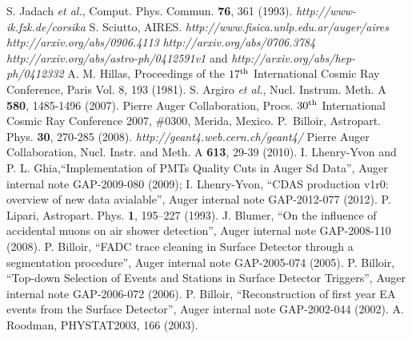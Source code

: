 \begin{thebibliography}{1}
 S. Jadach {\it et al.}, Comput. Phys. Commun. {\bf 76}, 361 (1993).
 \emph{http://www-ik.fzk.de/corsika}
 S. Sciutto, AIRES. \emph{http://www.fisica.unlp.edu.ar/auger/aires}
 \emph{http://arxiv.org/abs/0906.4113}
 \emph{http://arxiv.org/abs/0706.3784}
 \emph{http://arxiv.org/abs/astro-ph/0412591v1} and \emph{http://arxiv.org/abs/hep-ph/0412332}
 A. M. Hillas, Proceedings of the $17^{\rm th}$ International Cosmic Ray Conference, Paris Vol. 8, 193 (1981).
 S. Argiro {\it et al.}, Nucl. Instrum. Meth. A \textbf{580}, 1485-1496 (2007).
 Pierre Auger Collaboration, Procs. $30^{\rm th}$ International Cosmic Ray Conference 2007, $\#$0300, Merida, Mexico.
 P.~Billoir, Astropart. Phys. {\bf 30}, 270-285 (2008).
 \emph{http://geant4.web.cern.ch/geant4/}
 Pierre Auger Collaboration, Nucl. Instr. and Meth. A {\bf 613}, 29-39 (2010).
 I. Lhenry-Yvon and P. L. Ghia,``Implementation of PMTs Quality Cuts in Auger Sd Data'', Auger internal note GAP-2009-080 (2009);
I. Lhenry-Yvon, ``CDAS production v1r0: overview of new data avialable'', Auger internal note GAP-2012-077 (2012).
 P. Lipari, Astropart. Phys. \textbf{1}, 195–227 (1993).
 J. Blumer, ``On the influence of accidental muons on air shower detection'', 
Auger internal note GAP-2008-110 (2008).
  P. Billoir, ``FADC trace cleaning in Surface Detector through a segmentation procedure'', 
Auger internal note GAP-2005-074 (2005).
  P. Billoir, ``Top-down Selection of Events and Stations in Surface Detector Triggers'', 
Auger internal note GAP-2006-072 (2006).
 P. Billoir, ``Reconstruction of first year EA events from the Surface Detector'', 
Auger internal note GAP-2002-044 (2002).
 A. Roodman, PHYSTAT2003, 166 (2003).

\end{thebibliography}
